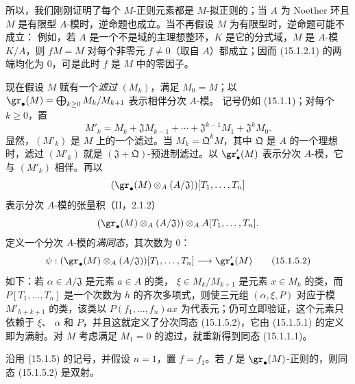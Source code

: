 所以，我们刚刚证明了每个 $M$-正则元素都是 $M$-拟正则的；当 $A$ 为 Noether 环且
$M$ 是有限型 $A$-模时，逆命题也成立。当不再假设 $M$ 为有限型时，逆命题可能不成立：
例如，若 $A$ 是一个不是域的主理想整环，$K$ 是它的分式域，$M$ 是 $A$-模
$K/A$，则 $fM=M$ 对每个非零元 $f\neq0$（取自 $A$）都成立；因而 (15.1.2.1) 的两端均化为
$0$，可是此时 $f$ 是 $M$ 中的零因子。

\begin{env}[15.1.5]
\label{0.15.1.5-fr}
现在假设 $M$ 赋有一个\emph{滤过} $(M_k)$，满足 $M_0=M$；以
$\gr_\bullet(M)=\bigoplus_{k\geq0}M_k/M_{k+1}$ 表示相伴分次 $A$-模。
记号仍如 (15.1.1)；对每个 $k\geq0$，置
\[
  M'_k=M_k+\mathfrak{J}M_{k-1}+\cdots+
  \mathfrak{J}^{k-1}M_1+\mathfrak{J}^kM_0.
  \tag{15.1.5.1}\label{0.15.1.5.1-fr}
\]
显然，$(M'_k)$ 是 $M$ 上的一个滤过。当
$M_k=\mathfrak{Q}^kM$，其中 $\mathfrak Q$ 是 $A$ 的一个理想时，滤过
$(M'_k)$ 就是 $(\mathfrak{J}+\mathfrak{Q})$-预进制滤过。以
$\gr'_\bullet(M)$ 表示分次 $A$-模，它与 $(M'_k)$ 相伴。再以
\[
  (\gr_\bullet(M)\otimes_A(A/\mathfrak{J}))[T_1,\ldots,T_n]
\]
表示分次 $A$-模的张量积（$\mathrm{II}$，2.1.2）
\[
  (\gr_\bullet(M)\otimes_A(A/\mathfrak{J}))
  \otimes_A A[T_1,\ldots,T_n].
\]
定义一个分次 $A$-模的\emph{满同态}，其次数为 $0$：
\[
  \psi:(\gr_\bullet(M)\otimes_A(A/\mathfrak{J}))[T_1,\ldots,T_n]
  \longrightarrow\gr'_\bullet(M)
  \tag{15.1.5.2}\label{0.15.1.5.2-fr}
\]
如下：若 $\alpha\in A/\mathfrak{J}$ 是元素 $a\in A$ 的类，
$\xi\in M_k/M_{k+1}$ 是元素 $x\in M_k$ 的类，而
$P[T_1,\ldots,T_n]$ 是一个次数为 $h$ 的齐次多项式，则使三元组
$(\alpha,\xi,P)$ 对应于模 $M'_{h+k+1}$ 的类，该类以
$P(f_1,\ldots,f_n)ax$ 为代表元；仍可立即验证，这个元素只依赖于 $\xi$、
$\alpha$ 和 $P$，并且这就定义了分次同态 (15.1.5.2)，它由 (15.1.5.1)
的定义即为满射。对 $M$ 考虑满足 $M_1=0$ 的滤过，就重新得到同态 (15.1.1.1)。
\end{env}

\begin{lemma}[15.1.6]
\label{0.15.1.6-fr}
沿用 (15.1.5) 的记号，并假设 $n=1$，置 $f=f_1$。若 $f$ 是
$\gr_\bullet(M)$-正则的，则同态 (15.1.5.2) 是双射。
\end{lemma}

